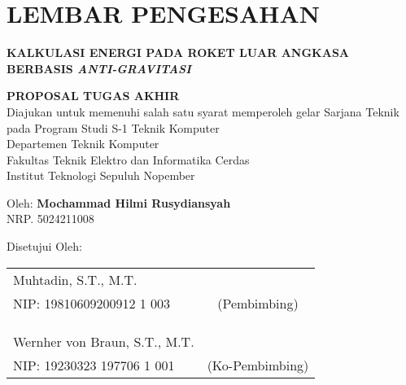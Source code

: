 \chapter*{LEMBAR PENGESAHAN}

\thispagestyle{empty}

\begin{center}
  \textbf{KALKULASI ENERGI PADA ROKET LUAR ANGKASA BERBASIS \emph{ANTI-GRAVITASI}}
\end{center}

\begingroup
\small

\begin{center}
  \textbf{PROPOSAL TUGAS AKHIR} \\
  Diajukan untuk memenuhi salah satu syarat memperoleh gelar
  Sarjana Teknik pada
  Program Studi S-1 Teknik Komputer \\
  Departemen Teknik Komputer \\
  Fakultas Teknik Elektro dan Informatika Cerdas \\
  Institut Teknologi Sepuluh Nopember
\end{center}

\begin{center}
  Oleh: \textbf{Mochammad Hilmi Rusydiansyah} \\
  NRP. 5024211008
\end{center}

\begin{center}
  Disetujui Oleh:
\end{center}

\vspace{10ex}

\begingroup
\setlength{\tabcolsep}{0pt}

\noindent
\begin{tabularx}{\textwidth}{X c}
  Muhtadin, S.T., M.T.      &                 \\
  NIP: 19810609200912 1 003    & (Pembimbing)    \\
                                &                 \\
                                &                 \\
                                &                 \\
  Wernher von Braun, S.T., M.T. &                 \\
  NIP: 19230323 197706 1 001    & (Ko-Pembimbing) \\
\end{tabularx}
\endgroup

